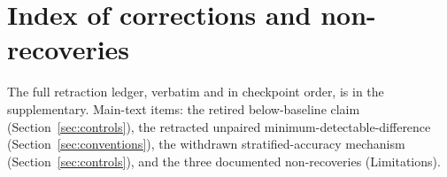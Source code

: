\section{Index of corrections and non-recoveries}
\label{app:corrections}
The full retraction ledger, verbatim and in checkpoint order, is in the supplementary. Main-text items:
the retired below-baseline claim (Section~\ref{sec:controls}), the retracted unpaired
minimum-detectable-difference (Section~\ref{sec:conventions}), the withdrawn stratified-accuracy mechanism
(Section~\ref{sec:controls}), and the three documented non-recoveries (Limitations). 